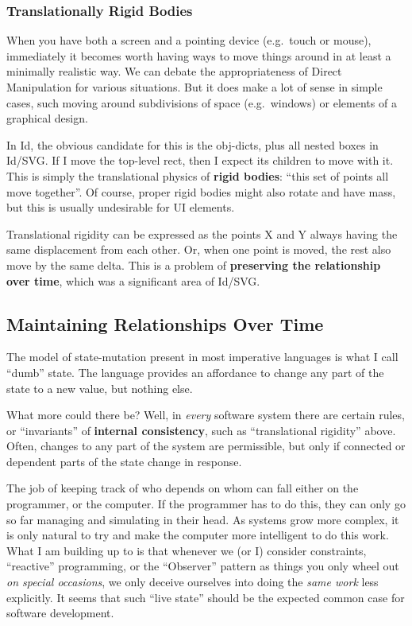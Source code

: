 \hypertarget{translationally-rigid-bodies}{%
\subsubsection{Translationally Rigid
Bodies}\label{translationally-rigid-bodies}}

When you have both a screen and a pointing device (e.g.~touch or mouse),
immediately it becomes worth having ways to move things around in at
least a minimally realistic way. We can debate the appropriateness of
Direct Manipulation for various situations. But it does make a lot of
sense in simple cases, such moving around subdivisions of space
(e.g.~windows) or elements of a graphical design.

In Id{}, the obvious candidate for this is the obj-dicts, plus all
nested boxes in Id{}/SVG. If I move the top-level rect, then I expect
its children to move with it. This is simply the translational physics
of \textbf{rigid bodies}: ``this set of points all move together''. Of
course, proper rigid bodies might also rotate and have mass, but this is
usually undesirable for UI elements.

Translational rigidity can be expressed as the points X and Y always
having the same displacement from each other. Or, when one point is
moved, the rest also move by the same delta. This is a problem of
\textbf{preserving the relationship over time}, which was a significant
area of Id{}/SVG.

\hypertarget{maintaining-relationships-over-time}{%
\subsection{Maintaining Relationships Over
Time}\label{maintaining-relationships-over-time}}

The model of state-mutation present in most imperative languages is what
I call ``dumb'' state. The language provides an affordance to change any
part of the state to a new value, but nothing else.

What more could there be? Well, in \emph{every} software system there
are certain rules, or ``invariants'' of \textbf{internal consistency},
such as ``translational rigidity'' above. Often, changes to any part of
the system are permissible, but only if connected or dependent parts of
the state change in response.

The job of keeping track of who depends on whom can fall either on the
programmer, or the computer. If the programmer has to do this, they can
only go so far managing and simulating in their head. As systems grow
more complex, it is only natural to try and make the computer more
intelligent to do this work. What I am building up to is that whenever
we (or I) consider constraints, ``reactive'' programming, or the
``Observer'' pattern as things you only wheel out \emph{on special
occasions}, we only deceive ourselves into doing the \emph{same work}
less explicitly. It seems that such ``live state'' should be the
expected common case for software development.

